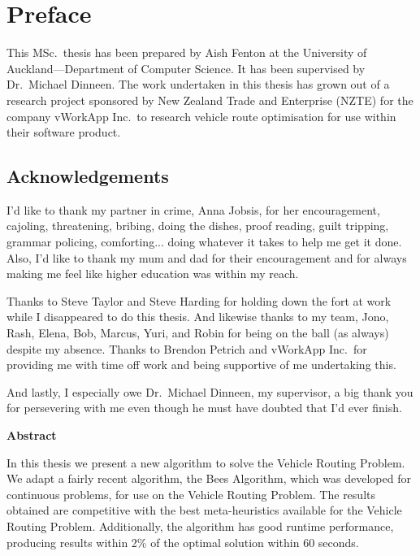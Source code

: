 
\chapter*{Preface}

This MSc.~thesis has been prepared by Aish Fenton at the University of Auckland---Department of Computer Science. It has been supervised by Dr.~Michael Dinneen. The work undertaken in this thesis has grown out of a research project sponsored by New Zealand Trade and Enterprise (NZTE) for the company vWorkApp Inc.~to research vehicle route optimisation for use within their software product.

\section*{Acknowledgements}

I'd like to thank my partner in crime, Anna Jobsis, for her encouragement, cajoling, threatening, bribing, doing the dishes, proof reading, guilt tripping, grammar policing, comforting... doing whatever it takes to help me get it done. Also, I'd like to thank my mum and dad for their encouragement and for always making me feel like higher education was within my reach.

Thanks to Steve Taylor and Steve Harding for holding down the fort at work while I disappeared to do this thesis. And likewise thanks to my team, Jono, Rash, Elena, Bob, Marcus, Yuri, and Robin for being on the ball (as always) despite my absence. Thanks to Brendon Petrich and vWorkApp Inc.~for providing me with time off work and being supportive of me undertaking this. 

And lastly, I especially owe Dr.~Michael Dinneen, my supervisor, a big thank you for persevering with me even though he must have doubted that I'd ever finish.

\cleardoublepage

\begin{center}
   \begin{minipage}{300pt}
   \begin{center}
      \textbf{Abstract}
   \end{center}
   In this thesis we present a new algorithm to solve the Vehicle Routing Problem. We adapt a fairly recent algorithm, the Bees Algorithm, which was developed for continuous problems, for use on the Vehicle Routing Problem. The results obtained are competitive with the best meta-heuristics available for the Vehicle Routing Problem. Additionally, the algorithm has good runtime performance, producing results within 2\% of the optimal solution within 60 seconds.
   \end{minipage}
\end{center}

\cleardoublepage
